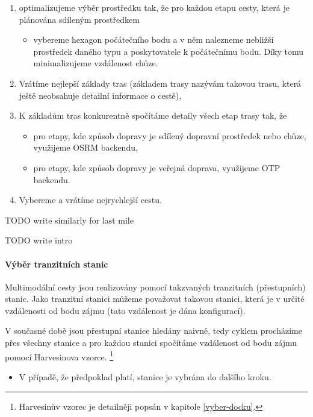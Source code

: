 \documentclass[thesis=M,czech]{FITthesis}[2019/12/23]
\theoremstyle{plain}
\theoremstyle{definition}
\begin{document}
\begin{enumerate}
	\item optimalizujeme výběr prostředku tak, že pro každou etapu cesty, která je plánována sdíleným prostředkem
	\begin{itemize}
		\item vybereme hexagon počátečního bodu a v něm nalezneme nebližší prostředek daného typu a poskytovatele k počátečnímu bodu. Díky tomu minimalizujeme vzdálenost chůze.
	\end{itemize}
	\item Vrátíme nejlepší základy tras (základem trasy nazývám takovou trasu, která ještě neobsahuje detailní informace o cestě),
	\item K základům tras konkurentně spočítáme detaily všech etap trasy tak, že
	\begin{itemize}
		\item pro etapy, kde způsob dopravy je sdílený dopravní prostředek nebo chůze, využijeme OSRM backendu,
		\item pro etapy, kde způsob dopravy je veřejná doprava, využijeme OTP backendu.
	\end{itemize}
	\item Vybereme a vrátíme nejrychlejší cestu.




\end{enumerate}

TODO write similarly for last mile



TODO write intro


\paragraph{Výběr tranzitních stanic} \label{vyber-tranzitnich-stanic}

Multimodální cesty jsou realizovány pomocí takzvaných tranzitních (přestupních) stanic. Jako tranzitní stanici můžeme považovat takovou stanici, která je v určité vzdálenosti od bodu zájmu (tato vzdálenost je dána konfigurací). 

V současné době jsou přestupní stanice hledány naivně, tedy cyklem procházíme přes všechny stanice a pro každou stanici spočítáme vzdálenost od bodu zájmu pomocí Harvesinova vzorce\cite{harvesine}. \footnote{Harvesinův vzorec je detailněji popsán v kapitole \ref{vyber-docku}.}
	\begin{itemize}
		\item V případě, že předpoklad platí, stanice je vybrána do dalšího kroku.
	\end{itemize}
\end{document}
